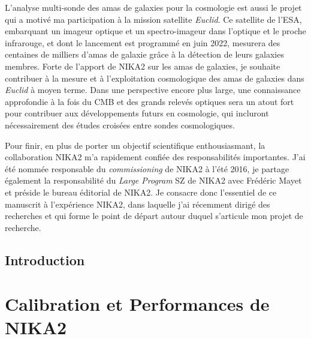 \documentclass[a4paper, 11pt]{report}
\begin{document}
L'analyse multi-sonde des amas de galaxies pour la cosmologie est
aussi le projet qui a motivé ma participation à la mission satellite
\emph{Euclid}. Ce satellite de l'ESA, embarquant un imageur optique et un
spectro-imageur dans l'optique et le proche infrarouge, et dont le
lancement est programmé en juin 2022, mesurera des centaines de
milliers d'amas de galaxie grâce à la détection de leurs galaxies
membres. Forte de l'apport de NIKA2 sur les amas de galaxies, je
souhaite contribuer à la mesure et à l'exploitation cosmologique des
amas de galaxies dans \emph{Euclid} à moyen terme. Dans une perspective
encore plus large, une connaissance approfondie à la fois du CMB et
des grands relevés optiques sera un atout fort pour contribuer aux
développements futurs en cosmologie, qui incluront nécessairement des
études croisées entre sondes cosmologiques.     

Pour finir, en plus de porter un objectif scientifique enthousiasmant,
la collaboration NIKA2 m'a rapidement confiée des responsabilités
importantes. J'ai été nommée responsable du \emph{commissioning} de
NIKA2 à l'été 2016, je partage également la responsabilité du \emph{Large
Program} SZ de NIKA2 avec Frédéric Mayet et préside le bureau éditorial
de NIKA2. Je consacre donc l'essentiel de ce manuscrit à l'expérience
NIKA2, dans laquelle j'ai récemment dirigé des recherches et qui
forme le point de départ autour duquel s'articule mon projet de
recherche.




\chapter*{Introduction}




%
%
%
%
%
%
%
%

%
%
%
%
%
%
%

\part{Calibration et Performances de NIKA2}
%
%   
%
\end{document}

